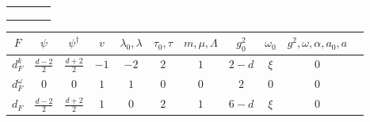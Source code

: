 \documentclass[12pt]{article}
\begin{document}
\begin{tabular}{|c|c|c|c|}
\hline  &  &  &  \\ 
\hline  &  &  &  \\ 
\hline  &  &  &  \\ 
\hline  &  &  &  \\ 
\hline 
\end{tabular} 

\begin{tabular}{|c|c|c|c|c|c|c|c|c|c|c|}
\hline
$F$          & $\psi$ & $\psi^\dagger$ & $v$ & $\lambda_0,\lambda$ & $\tau_0,\tau$ & $ m,\mu,\Lambda$ & $g_0^2$ & $\omega_0$ & $g^2,\omega,\alpha,a_0,a$ \\
\hline
$d_F^k$      & $\frac{d-2}{2}$ & $\frac{d+2}{2}$ & $-1$ & $-2$ & $2$ & $1$ & $2-d$ & $\xi$ & $0$ \\
\hline
$d_F^\omega$ & 0 & 0 & $1$ & $1$ & $0$ & $0$ & $2$ & $0$ & $0$ \\
\hline
$d_F$        & $\frac{d-2}{2}$ & $\frac{d+2}{2}$ & $1$ & $0$ & $2$ & $1$ & $6-d$ & $\xi$ & $0$ \\
\hline
\end{tabular}
\end{document}
